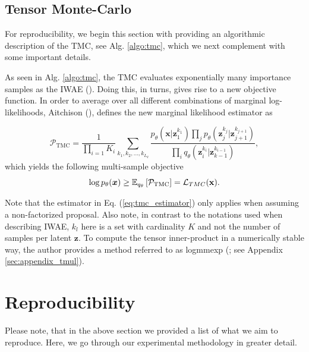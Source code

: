 \subsection{Tensor Monte-Carlo}
For reproducibility, we begin this section with providing an algorithmic description of the TMC, see Alg. \ref{algo:tmc}, which we next complement with some important details.



As seen in Alg. \ref{algo:tmc}, the TMC 
evaluates exponentially many importance samples as the IWAE (\cite{tmc, iwae}). Doing this, in turns, gives rise to a new objective function. In order to average over all different combinations of marginal log-likelihoods, Aitchison (\cite{tmc}), defines the new marginal likelihood estimator as

\begin{equation}
    \mathcal{P}_{\text{TMC}} = \frac{1}{\prod\limits_{i=1} K_i}
    \sum\limits_{k_1, k_2, ..., k_{L_q}} \frac{p_{\theta}(\bm x|\bm z^{k_1}_1)\prod_{j}p_{\theta}(\bm z^{k_j}_{j}|\bm z^{k_{j+1}}_{j+1})}
    {\prod\limits_i q_{\theta}(\bm z_i^{k_i}| \bm z_{k-1}^{k_{i-1}})},
    \label{eq:tmc_estimator}
\end{equation}
which yields the following multi-sample objective
\begin{equation}
    \log p_{\theta}(\bm x) \geq \mathbb E_{q_{\theta}} \left[\mathcal{P}_{\text{TMC}}\right] = \mathcal{L}_{TMC} (\bold x).
    \label{eq:tmc_loss}
\end{equation}

Note that the estimator in Eq. (\ref{eq:tmc_estimator}) only applies when assuming a non-factorized proposal. Also note, in contrast to the notations used when describing IWAE, $k_l$ here is a set with cardinality $K$ and not the number of samples per latent $\bm z$. To compute the tensor inner-product in a numerically stable way, the author provides a method referred to as logmmexp (\cite{tmc}; see Appendix \ref{sec:appendix_tmul}).



\section{Reproducibility}
Please note, that in the above section we provided a list of what we aim to reproduce.
Here, we go through our experimental methodology in greater detail. 





